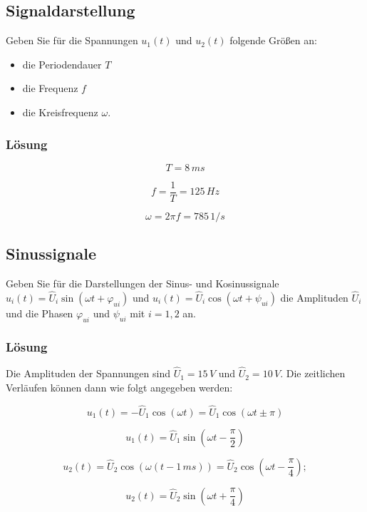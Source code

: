 \documentclass[
  ngerman,
  letterpaper,
]{scrbook}
\begin{document}
\subsection{Signaldarstellung}\label{signaldarstellung}

Geben Sie für die Spannungen \(u_1(t)\) und \(u_2(t)\) folgende Größen
an:

\begin{itemize}
\item
  die Periodendauer \(T\)
\item
  die Frequenz \(f\)
\item
  die Kreisfrequenz \(\omega\).
\end{itemize}

\subsubsection{Lösung}\label{luxf6sung-8}

\[
T = 8\,ms 
\]

\[
f = \frac{1}{T}=125\,Hz 
\]

\[
\omega = 2\pi f = 785\,1/s
\]

\subsection{Sinussignale}\label{sinussignale}

Geben Sie für die Darstellungen der Sinus- und Kosinussignale
\(u_i(t) = \hat{U}_i \sin(\omega t + \varphi_{ui})\) und
\(u_i(t) = \hat{U}_i \cos(\omega t + \psi_{ui})\) die Amplituden
\(\hat{U}_i\) und die Phasen \(\varphi_{ui}\) und \(\psi_{ui}\) mit
\(i=1,2\) an.

\subsubsection{Lösung}\label{luxf6sung-9}

Die Amplituden der Spannungen sind \(\hat{U}_1=15\,V\) und
\(\hat{U}_2=10\,V\). Die zeitlichen Verläufen können dann wie folgt
angegeben werden:

\[
u_1(t) = -\hat{U}_1 \cos(\omega t) = \hat{U}_1 \cos(\omega t  \pm \pi) 
\]

\[
u_1(t) = \hat{U}_1 \sin\left(\omega t - \frac{\pi}{2}\right) 
\]

\[
u_2(t) = \hat{U}_2 \cos(\omega(t- 1\,ms)) = \hat{U}_2 \cos\left(\omega t - \frac{\pi}{4}\right); 
\]

\[
u_2(t) = \hat{U}_2 \sin\left(\omega t + \frac{\pi}{4}\right)
\]
\end{document}
